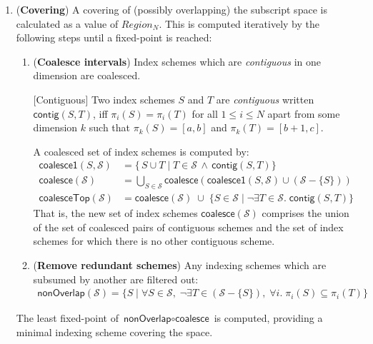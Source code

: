 \begin{enumerate}[leftmargin=1.5em]
\item (\textbf{Covering})
A covering of (possibly overlapping) the subscript space
is calculated as a value of $Region_N$. This is computed iteratively
by the following steps until a fixed-point is reached:

\begin{enumerate}[leftmargin=0.5em]
\item (\textbf{Coalesce intervals})
%
Index schemes which are \emph{contiguous} in one dimension are
coalesced.

\newcommand{\contig}[2]{\mathsf{contig}(#1, #2)}
\begin{defn}{[Contiguous]}
Two index schemes $S$ and $T$ are \emph{contiguous}
written $\contig{S}{T}$,
iff $\pi_i(S) = \pi_i(T)$
for all $1 \leq i \leq N$ apart from some dimension $k$ such that
$\pi_k(S) = [a, b]$ and $\pi_k(T) = [b+1, c]$.
\end{defn}
%
A coalesced set of index schemes is computed by:%
\begin{align*}
\mathsf{coalesce1}(S, \mathcal{S}) & =
 \{\,S \cup T \mid
T \in \mathcal{S} \, \wedge \,
\contig{S}{T} \} \\
\mathsf{coalesce}(\mathcal{S}) & =
\bigcup_{S \in \mathcal{S}} \mathsf{coalesce}(
\mathsf{coalesce1}(S, \mathcal{S})
\cup (\mathcal{S} - \{S\})) \\
\mathsf{coalesceTop}(\mathcal{S}) & =
 \mathsf{coalesce}(\mathcal{S})
\; \cup \;
\{ S \in \mathcal{S} \mid \neg \exists T \in \mathcal{S} . \; \contig{S}{T}\}
\end{align*}
%
That is, the new set of index schemes $\mathsf{coalesce}(\mathcal{S})$
comprises the union of the set of coalesced pairs of contiguous
schemes and the set of index schemes for which there is no other
contiguous scheme.
\item (\textbf{Remove redundant schemes})
Any indexing schemes which are subsumed by another are filtered out:
%
\begin{align*}
\textsf{nonOverlap}(\mathcal{S}) =
\{S \mid \forall S \in \mathcal{S}, \; \neg \exists T \in (\mathcal{S} -
  \{S\}), \; \forall i . \; \pi_i(S) \subseteq \pi_i(T) \}
\end{align*}
%
\end{enumerate}
The least fixed-point of $\textsf{nonOverlap} \circ \textsf{coalesce}$
is computed, providing a minimal indexing scheme covering the space.


\end{enumerate}
